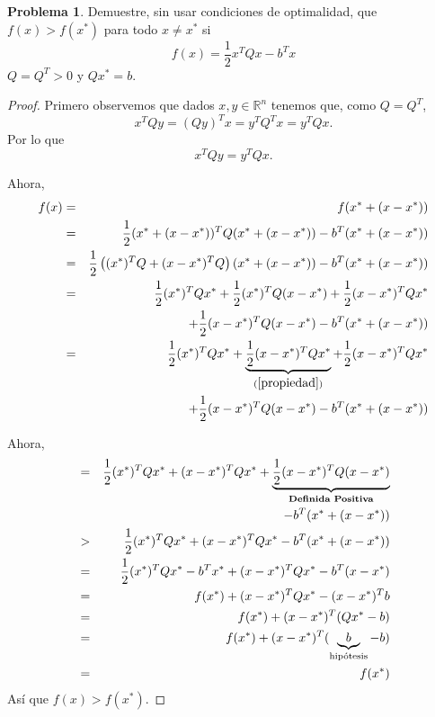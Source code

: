 \documentclass[12pt,letterpaper]{article}
\theoremstyle{definition}
\newtheorem{problm}{Problema}
\begin{document}
\begin{problm}
	Demuestre, sin usar condiciones de optimalidad, que $ f(x) > f(x^*) $ para todo $ x \neq x^* $ si
	\[ f(x) = \dfrac{1}{2} x^T Q x - b^T x \]
	$ Q = Q^T > 0 $ y $ Q x^* = b $.
	\begin{proof}
		Primero observemos que dados $ x,y\in\mathbb{R}^n $ tenemos que, como $ Q = Q^T $,
		\[ x^T Q y = (Qy)^T x = y^T Q^T x = y^T Q x. \]
		Por lo que
		\begin{equation}\label{propiedad}
			x^T Q y = y^T Q x.
		\end{equation}
		
		Ahora,
		\begin{eqnarray*}
			f(x) & = & f(x^* + (x - x^*)) \\
				& = & \dfrac{1}{2} (x^* + (x - x^*))^T Q (x^* + (x - x^*)) - b^T (x^* + (x - x^*)) \\
				& = & \dfrac{1}{2} \left(  (x^*)^T Q + (x - x^*)^T Q \right) (x^* + (x - x^*)) - b^T (x^* + (x - x^*)) \\
				& = & \dfrac{1}{2} (x^*)^T Q x^* + \dfrac{1}{2} (x^*)^T Q (x - x^*) + \dfrac{1}{2} (x - x^*)^T Q x^* \\
				&   & + \dfrac{1}{2} (x - x^*)^T Q (x - x^*) -b^T(x^* + (x - x^*)) \\
				& = & \dfrac{1}{2} (x^*)^T Q x^* +\underbrace{ \dfrac{1}{2} (x - x^*)^T Q x^*}_{(\ref{propiedad})} + \dfrac{1}{2} (x - x^*)^T Q x^* \\
				&   & + \dfrac{1}{2} (x - x^*)^T Q (x - x^*) -b^T(x^* + (x - x^*))
			\end{eqnarray*}
	
	
	
	
	
	
		Ahora,
		\begin{eqnarray*}
			     & = & \dfrac{1}{2} (x^*)^T Q x^* + (x - x^*)^T Q x^* + \underbrace{\dfrac{1}{2} (x - x^*)^T Q (x - x^*)}_{\textbf{Definida Positiva}} \\
			     &   & - b^T(x^* + (x - x^*)) \\
			     & > & \dfrac{1}{2} (x^*)^T Q x^* + (x - x^*)^T Q x^* - b^T(x^* + (x - x^*))  \\
			     & = & \dfrac{1}{2} (x^*)^T Q x^* - b^T x^* + (x - x^*)^T Q x^* - b^T(x - x^*)  \\
			     & = & f(x^*) + (x - x^*)^T Q x^* - (x - x^*)^T b  \\
			     & = & f(x^*) + (x - x^*)^T (Q x^* - b)  \\
			     & = & f(x^*) + (x - x^*)^T (\underbrace{b}_{\textup{hipótesis}} - b)  \\
			     & = & f(x^*)
		\end{eqnarray*}
		Así que $ f(x) > f(x^*) $.
	\end{proof}
\end{problm}
\end{document}

